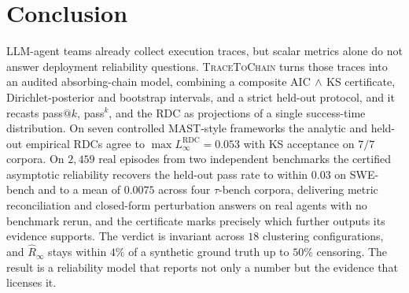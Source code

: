 \section{Conclusion}
\label{sec:conc}

LLM-agent teams already collect execution traces, but scalar metrics
alone do not answer deployment reliability questions.
\textsc{TraceToChain} turns those traces into an audited absorbing-chain
model, combining a composite AIC$\,\wedge\,$KS certificate,
Dirichlet-posterior and bootstrap intervals, and a strict held-out
protocol, and it recasts pass$@k$, pass$^k$, and the RDC as projections
of a single success-time distribution. On seven controlled MAST-style
frameworks the analytic and held-out empirical RDCs agree to
$\max L_\infty^{\mathrm{RDC}}=0.053$ with KS acceptance on $7/7$
corpora. On $2{,}459$ real episodes from two independent benchmarks the
certified asymptotic reliability recovers the held-out pass rate to
within $0.03$ on SWE-bench and to a mean of $0.0075$ across four
$\tau$-bench corpora, delivering metric reconciliation and closed-form
perturbation answers on real agents with no benchmark rerun, and the
certificate marks precisely which further outputs its evidence
supports. The verdict is invariant across $18$ clustering configurations, and
$\hat R_\infty$ stays within $4\%$ of a synthetic ground truth up to
$50\%$ censoring. The result is a reliability model that reports not
only a number but the evidence that licenses it.

